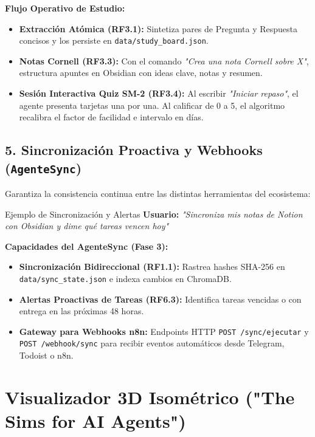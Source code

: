 \documentclass[11pt,a4paper]{article}
\begin{document}
\textbf{Flujo Operativo de Estudio:}
\begin{itemize}
    \item \textbf{Extracción Atómica (RF3.1):} Sintetiza pares de Pregunta y Respuesta concisos y los persiste en \texttt{data/study\_board.json}.
    \item \textbf{Notas Cornell (RF3.3):} Con el comando \textit{"Crea una nota Cornell sobre X"}, estructura apuntes en Obsidian con ideas clave, notas y resumen.
    \item \textbf{Sesión Interactiva Quiz SM-2 (RF3.4):} Al escribir \textit{"Iniciar repaso"}, el agente presenta tarjetas una por una. Al calificar de 0 a 5, el algoritmo recalibra el factor de facilidad e intervalo en días.
\end{itemize}

\subsection{5. Sincronización Proactiva y Webhooks (\texttt{AgenteSync})}
Garantiza la consistencia continua entre las distintas herramientas del ecosistema:

\begin{infobox}{Ejemplo de Sincronización y Alertas}
\textbf{Usuario:} \textit{"Sincroniza mis notas de Notion con Obsidian y dime qué tareas vencen hoy"}
\end{infobox}

\textbf{Capacidades del AgenteSync (Fase 3):}
\begin{itemize}
    \item \textbf{Sincronización Bidireccional (RF1.1):} Rastrea hashes SHA-256 en \texttt{data/sync\_state.json} e indexa cambios en ChromaDB.
    \item \textbf{Alertas Proactivas de Tareas (RF6.3):} Identifica tareas vencidas o con entrega en las próximas 48 horas.
    \item \textbf{Gateway para Webhooks n8n:} Endpoints HTTP \texttt{POST /sync/ejecutar} y \texttt{POST /webhook/sync} para recibir eventos automáticos desde Telegram, Todoist o n8n.
\end{itemize}

\section{Visualizador 3D Isométrico ("The Sims for AI Agents")}
\end{document}
